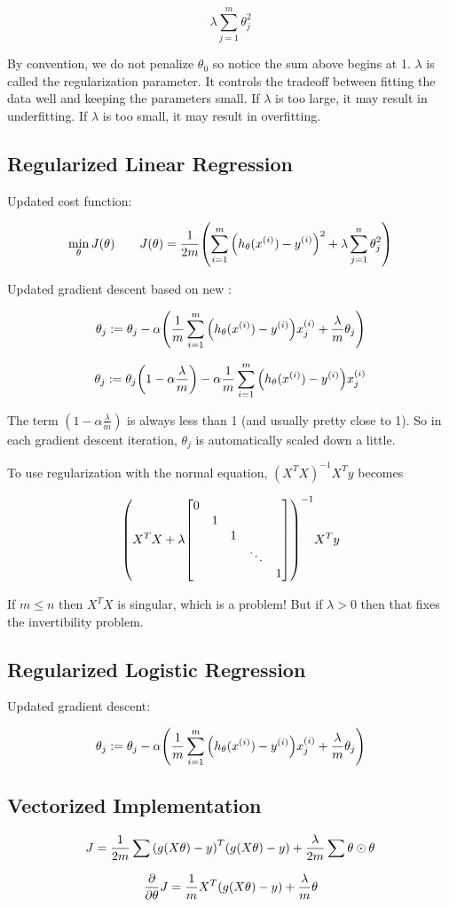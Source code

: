 \[ \lambda \sum_{j=1}^m \theta_j^2 \]

By convention, we do not penalize $\theta_0$ so notice the sum above begins at 1.
$\lambda$ is called the regularization parameter.
It controls the tradeoff between fitting the data well and keeping the parameters small.
If $\lambda$ is too large, it may result in underfitting.
If $\lambda$ is too small, it may result in overfitting.

\subsection{Regularized Linear Regression}

Updated cost function:

\[
  \min_\theta J(\theta)
  \qquad
  J(\theta) = \frac{1}{2m} \qty(
    \sum_{i=1}^m \qty( h_\theta(x_{}^{(i)}) - y_{}^{(i)} )^2
    + \lambda \sum_{j=1}^n \theta_j^2
  )
\]

Updated gradient descent based on new :

\[
  \theta_j := \theta_j - \alpha \qty(
    \frac{1}{m} \sum_{i=1}^m \qty( h_\theta(x_{}^{(i)}) - y_{}^{(i)}) x_{j}^{(i)}
    + \frac{\lambda}{m} \theta_j
  )
\]

\[
  \theta_j := \theta_j \qty( 1 - \alpha \frac{\lambda}{m} )
  - \alpha \frac{1}{m} \sum_{i=1}^m \qty( h_\theta(x_{}^{(i)}) - y_{}^{(i)}) x_{j}^{(i)}
\]

The term $(1-\alpha\frac{\lambda}{m})$ is always less than 1 (and usually pretty close to 1).
So in each gradient descent iteration, $\theta_j$ is automatically scaled down a little.

To use regularization with the normal equation, $(X^T X)^{-1} X^T y$ becomes

\[ \qty( X^T X + \lambda \mqty[\dmat{0, 1, 1, \ddots, 1 }])^{-1} X^T y \]

If $m \leq n$ then $X^T X$ is singular, which is a problem!
But if $\lambda > 0$ then that fixes the invertibility problem.

\subsection{Regularized Logistic Regression}

Updated gradient descent:

\[
  \theta_j := \theta_j - \alpha \qty(
    \frac{1}{m} \sum_{i=1}^m \qty( h_\theta(x_{}^{(i)}) - y_{}^{(i)}) x_{j}^{(i)}
    + \frac{\lambda}{m} \theta_j
  )
\]

\subsection{Vectorized Implementation}

\[
  J = \frac{1}{2m} \sum \qty( g(X\theta) - y)^T \qty( g(X\theta) - y)
      + \frac{\lambda}{2m} \sum \theta \odot \theta 
\]

\[
  \pdv{\theta} J = \frac{1}{m} X^T (g(X\theta) - y)
                 + \frac{\lambda}{m} \theta
\]